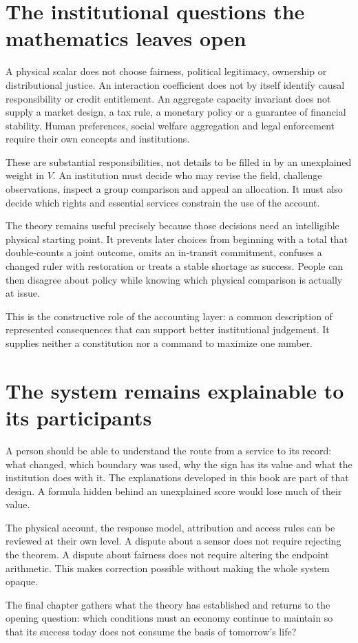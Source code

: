 \section{The institutional questions the mathematics leaves open}
A physical scalar does not choose fairness, political legitimacy, ownership or distributional justice. An interaction coefficient does not by itself identify causal responsibility or credit entitlement. An aggregate capacity invariant does not supply a market design, a tax rule, a monetary policy or a guarantee of financial stability. Human preferences, social welfare aggregation and legal enforcement require their own concepts and institutions.

These are substantial responsibilities, not details to be filled in by an unexplained weight in $V$. An institution must decide who may revise the field, challenge observations, inspect a group comparison and appeal an allocation. It must also decide which rights and essential services constrain the use of the account.

The theory remains useful precisely because those decisions need an intelligible physical starting point. It prevents later choices from beginning with a total that double-counts a joint outcome, omits an in-transit commitment, confuses a changed ruler with restoration or treats a stable shortage as success. People can then disagree about policy while knowing which physical comparison is actually at issue.

This is the constructive role of the accounting layer: a common description of represented consequences that can support better institutional judgement. It supplies neither a constitution nor a command to maximize one number.

\section{The system remains explainable to its participants}
A person should be able to understand the route from a service to its record: what changed, which boundary was used, why the sign has its value and what the institution does with it. The explanations developed in this book are part of that design. A formula hidden behind an unexplained score would lose much of their value.

The physical account, the response model, attribution and access rules can be reviewed at their own level. A dispute about a sensor does not require rejecting the theorem. A dispute about fairness does not require altering the endpoint arithmetic. This makes correction possible without making the whole system opaque.

The final chapter gathers what the theory has established and returns to the opening question: which conditions must an economy continue to maintain so that its success today does not consume the basis of tomorrow's life?
